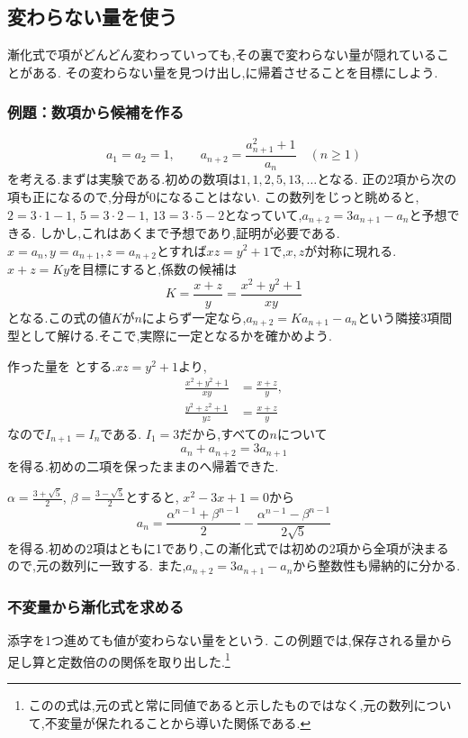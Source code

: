 \subsection{変わらない量を使う}\label{節：変わらない量を使う}
漸化式で項がどんどん変わっていっても,その裏で変わらない量が隠れていることがある.
その変わらない量を見つけ出し,に帰着させることを目標にしよう.

\subsubsection{例題：数項から候補を作る}
\[
  a_1=a_2=1,\qquad
  a_{n+2}=\frac{a_{n+1}^2+1}{a_n}\quad(n\ge1)
\]
を考える.まずは実験である.初めの数項は$1,1,2,5,13,\ldots$となる.
正の2項から次の項も正になるので,分母が0になることはない.
この数列をじっと眺めると,$2=3\cdot1-1$, $5=3\cdot2-1$, $13=3\cdot5-2$となっていて,$a_{n+2}=3a_{n+1}-a_n$と予想できる.
しかし,これはあくまで予想であり,証明が必要である.
$x=a_n,y=a_{n+1},z=a_{n+2}$とすれば$xz=y^2+1$で,$x,z$が対称に現れる.
$x+z=Ky$を目標にすると,係数の候補は
\[
  K=\frac{x+z}{y}=\frac{x^2+y^2+1}{xy}
\]
となる.この式の値$K$が$n$によらず一定なら,$a_{n+2}=Ka_{n+1}-a_n$という隣接3項間型として解ける.そこで,実際に一定となるかを確かめよう.

作った量を
\BookMathLayout{\[
    I_n=\frac{a_n^2+a_{n+1}^2+1}{a_na_{n+1}}
  \]}{\[
    \begin{aligned}
      I_n=\frac{a_n^2+a_{n+1}^2+1}{a_na_{n+1}}
    \end{aligned}
  \]}
とする.$xz=y^2+1$より,
\[
  \begin{aligned}
    \frac{x^2+y^2+1}{xy}&=\frac{x+z}{y},\\
    \frac{y^2+z^2+1}{yz}&=\frac{x+z}{y}
  \end{aligned}
\]
なので$I_{n+1}=I_n$である.
$I_1=3$だから,すべての$n$について
\[
  a_n+a_{n+2}=3a_{n+1}
\]
を得る.初めの二項を保ったままのへ帰着できた.

$\alpha=\frac{3+\sqrt5}{2}$, $\beta=\frac{3-\sqrt5}{2}$とすると,
$x^2-3x+1=0$から
\[
  a_n=\frac{\alpha^{n-1}+\beta^{n-1}}2
  -\frac{\alpha^{n-1}-\beta^{n-1}}{2\sqrt5}
\]
を得る.初めの2項はともに1であり,この漸化式では初めの2項から全項が決まるので,元の数列に一致する.
また,$a_{n+2}=3a_{n+1}-a_n$から整数性も帰納的に分かる.

\subsubsection{不変量から漸化式を求める}
添字を1つ進めても値が変わらない量を\textbf{}という.
この例題では,保存される量から足し算と定数倍のの関係を取り出した.\footnote{このの式は,元の式と常に同値であると示したものではなく,元の数列について,不変量が保たれることから導いた関係である.}

